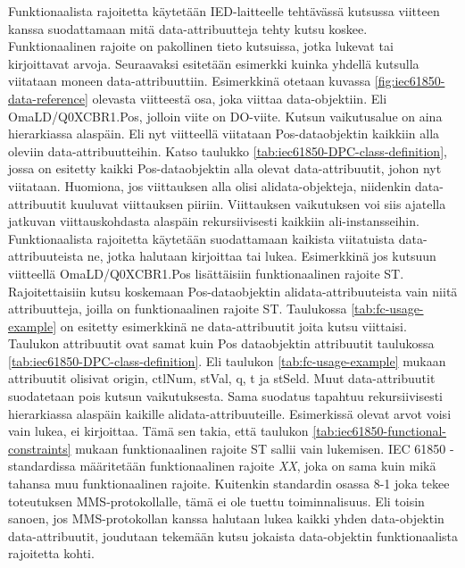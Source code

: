 Funktionaalista rajoitetta käytetään IED-laitteelle tehtävässä kutsussa viitteen kanssa suodattamaan mitä data-attribuutteja tehty kutsu koskee. Funktionaalinen rajoite on pakollinen tieto kutsuissa, jotka lukevat tai kirjoittavat arvoja. Seuraavaksi esitetään esimerkki kuinka yhdellä kutsulla viitataan moneen data-attribuuttiin. Esimerkkinä otetaan kuvassa \ref{fig:iec61850-data-reference} olevasta viitteestä osa, joka viittaa data-objektiin. Eli OmaLD/Q0XCBR1.Pos, jolloin viite on DO-viite. Kutsun vaikutusalue on aina hierarkiassa alaspäin. Eli nyt viitteellä viitataan Pos-dataobjektin kaikkiin alla oleviin data-attribuutteihin. Katso taulukko \ref{tab:iec61850-DPC-class-definition}, jossa on esitetty kaikki Pos-dataobjektin alla olevat data-attribuutit, johon nyt viitataan. Huomiona, jos viittauksen alla olisi alidata-objekteja, niidenkin data-attribuutit kuuluvat viittauksen piiriin. Viittauksen vaikutuksen voi siis ajatella jatkuvan viittauskohdasta alaspäin rekursiivisesti kaikkiin ali-instansseihin. Funktionaalista rajoitetta käytetään suodattamaan kaikista viitatuista data-attribuuteista ne, jotka halutaan kirjoittaa tai lukea. Esimerkkinä jos kutsuun viitteellä OmaLD/Q0XCBR1.Pos lisättäisiin funktionaalinen rajoite ST. Rajoitettaisiin kutsu koskemaan Pos-dataobjektin alidata-attribuuteista vain niitä attribuutteja, joilla on funktionaalinen rajoite ST. Taulukossa \ref{tab:fc-usage-example} on esitetty esimerkkinä ne data-attribuutit joita kutsu viittaisi. Taulukon attribuutit ovat samat kuin Pos dataobjektin attribuutit taulukossa \ref{tab:iec61850-DPC-class-definition}. Eli taulukon \ref{tab:fc-usage-example} mukaan attribuutit olisivat origin, ctlNum, stVal, q, t ja stSeld. Muut data-attribuutit suodatetaan pois kutsun vaikutuksesta. Sama suodatus tapahtuu rekursiivisesti hierarkiassa alaspäin kaikille alidata-attribuuteille. Esimerkissä olevat arvot voisi vain lukea, ei kirjoittaa. Tämä sen takia, että taulukon \ref{tab:iec61850-functional-constraints} mukaan funktionaalinen rajoite ST sallii vain lukemisen. IEC 61850 -standardissa määritetään funktionaalinen rajoite \emph{XX}, joka on sama kuin mikä tahansa muu funktionaalinen rajoite. Kuitenkin standardin osassa 8-1 joka tekee toteutuksen MMS-protokollalle, tämä ei ole tuettu toiminnalisuus. Eli toisin sanoen, jos MMS-protokollan kanssa halutaan lukea kaikki yhden data-objektin data-attribuutit, joudutaan tekemään kutsu jokaista data-objektin funktionaalista rajoitetta kohti.

